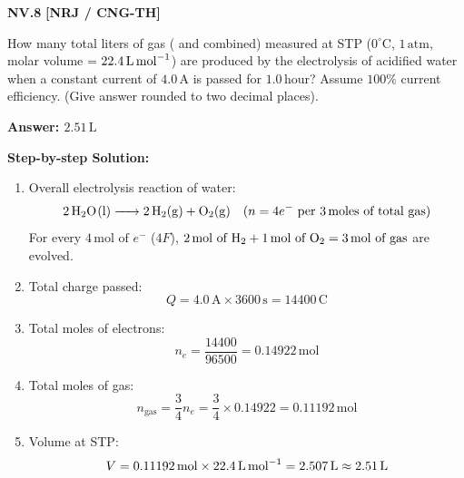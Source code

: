 \begin{problembox}
\textbf{NV.8} \hfill \textbf{[NRJ / CNG-TH]}

How many total liters of gas ( and  combined) measured at STP ($0^\circ\text{C}$, $1\,\text{atm}$, molar volume = $22.4\,\text{L\,mol}^{-1}$) are produced by the electrolysis of acidified water when a constant current of $4.0\,\text{A}$ is passed for $1.0\,\text{hour}$? Assume $100\%$ current efficiency. (Give answer rounded to two decimal places).
\end{problembox}
\begin{solution}
\textbf{Answer: $2.51\,\text{L}$}

\textbf{Step-by-step Solution:}
\begin{enumerate}
    \item Overall electrolysis reaction of water:
    \begin{equation*}
        \ce{2H2O(l) -> 2H2(g) + O2(g)} \quad (n = 4e^- \text{ per } 3\,\text{moles of total gas})
    \end{equation*}
    For every $4\,\text{mol of } e^-$ ($4F$), $2\,\text{mol of } \ce{H2} + 1\,\text{mol of } \ce{O2} = 3\,\text{mol of gas}$ are evolved.
    \item Total charge passed:
    \begin{equation*}
        Q = 4.0\,\text{A} \times 3600\,\text{s} = 14400\,\text{C}
    \end{equation*}
    \item Total moles of electrons:
    \begin{equation*}
        n_e = \frac{14400}{96500} = 0.14922\,\text{mol}
    \end{equation*}
    \item Total moles of gas:
    \begin{equation*}
        n_{\text{gas}} = \frac{3}{4} n_e = \frac{3}{4} \times 0.14922 = 0.11192\,\text{mol}
    \end{equation*}
    \item Volume at STP:
    \begin{equation*}
        V = 0.11192\,\text{mol} \times 22.4\,\text{L\,mol}^{-1} = 2.507\,\text{L} \approx 2.51\,\text{L}
    \end{equation*}
\end{enumerate}
\end{solution}
